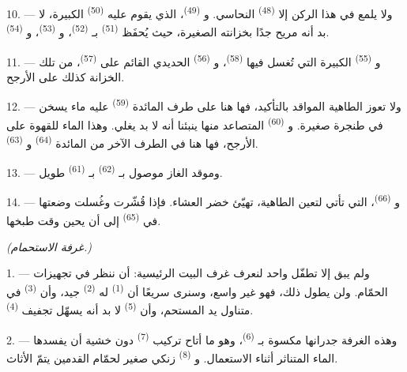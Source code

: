 10. --- ولا يلمع في هذا الركن إلا  \textsuperscript{(48)}
النحاسي. و \textsuperscript{(49)}، الذي يقوم عليه 
\textsuperscript{(50)} الكبيرة، لا بد أنه مريح جدًا بخزانته الصغيرة، حيث
يُحفَظ  \textsuperscript{(51)} بـ
\textsuperscript{(52)}، و \textsuperscript{(53)}،
و \textsuperscript{(54)}.

\VUsaut{4.0mm}
\VUsaut{3.0mm}

11. --- و \textsuperscript{(55)} الكبيرة التي تُغسل فيها
 \textsuperscript{(58)}، و \textsuperscript{(56)}
الحديدي القائم على  \textsuperscript{(57)}، من تلك
الخزانة كذلك على الأرجح.

12. --- ولا تعوز الطاهية المواقد بالتأكيد، فها هنا على طرف المائدة
 \textsuperscript{(59)} عليه ماء يسخن في طنجرة صغيرة.
و \textsuperscript{(60)} المتصاعد منها ينبئنا أنه لا بد يغلي.
وهذا الماء للقهوة على الأرجح، فها هنا في الطرف الآخر من المائدة
 \textsuperscript{(64)} و
\textsuperscript{(63)}.

13. --- وموقد الغاز موصول بـ \textsuperscript{(62)}
بـ \textsuperscript{(61)} طويل.

14. --- و \textsuperscript{(66)}، التي تأتي لتعين
الطاهية، تهيّئ خضر العشاء. فإذا قُشّرت وغُسلت وضعتها في 
\textsuperscript{(65)} إلى أن يحين وقت طبخها.

\VUsaut{4.0mm}
{\centering\fontsize{10.2pt}{10.2pt}\selectfont{} \textit{(غرفة الاستحمام.)}\par}
\VUsaut{3.0mm}

1. --- ولم يبق إلا تطفّل واحد لنعرف غرف البيت الرئيسية: أن ننظر في
تجهيزات الحمّام. ولن يطول ذلك، فهو غير واسع، وسنرى سريعًا أن
 \textsuperscript{(1)} له  \textsuperscript{(2)}
جيد، وأن  \textsuperscript{(3)} في متناول يد المستحم، وأن
 \textsuperscript{(5)} لا بد أنه يسهّل تجفيف
 \textsuperscript{(4)}.

2. --- وهذه الغرفة جدرانها مكسوة بـ \textsuperscript{(6)}،
وهو ما أتاح تركيب  \textsuperscript{(7)} دون خشية أن يفسدها الماء
المتناثر أثناء الاستعمال. و \textsuperscript{(8)} زنكي صغير لحمّام
القدمين يتمّ الأثاث.
\VUsaut{6.0mm}
\VUfilet{22mm}
